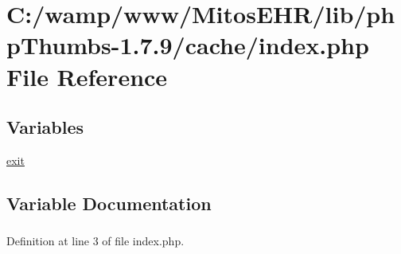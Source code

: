 \hypertarget{lib_2php_thumbs-1_87_89_2cache_2index_8php}{\section{\-C\-:/wamp/www/\-Mitos\-E\-H\-R/lib/php\-Thumbs-\/1.7.9/cache/index.php \-File \-Reference}
\label{lib_2php_thumbs-1_87_89_2cache_2index_8php}
}
\subsection*{\-Variables}
\begin{DoxyCompactItemize}
\item 
\hyperlink{lib_2php_thumbs-1_87_89_2cache_2index_8php_a6733eb5f605d09eaede9845835d71c4e}{exit}
\end{DoxyCompactItemize}


\subsection{\-Variable \-Documentation}
\hypertarget{lib_2php_thumbs-1_87_89_2cache_2index_8php_a6733eb5f605d09eaede9845835d71c4e}{
\subsubsection[{exit}]{}}\label{lib_2php_thumbs-1_87_89_2cache_2index_8php_a6733eb5f605d09eaede9845835d71c4e}


\-Definition at line 3 of file index.\-php.


